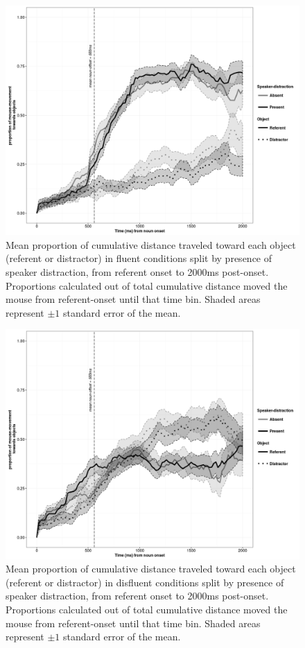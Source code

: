 \documentclass[man]{apa6}
\begin{document}
\begin{figure}
  \centering
	\includegraphics[scale=.5]{mflu.png}
  \caption{Mean proportion of cumulative distance traveled toward each object (referent or distractor) in fluent conditions split by presence of speaker distraction, from referent onset to 2000ms post-onset. Proportions calculated out of total cumulative distance moved the mouse from referent-onset until that time bin. Shaded areas represent $\pm 1$ standard error of the mean.}
  \label{fig:mflu}
\end{figure}





\begin{figure}
  \centering
	\includegraphics[scale=.5]{mdisfl.png}
  \caption{Mean proportion of cumulative distance traveled toward each object (referent or distractor) in disfluent conditions split by presence of speaker distraction, from referent onset to 2000ms post-onset. Proportions calculated out of total cumulative distance moved the mouse from referent-onset until that time bin. Shaded areas represent $\pm 1$ standard error of the mean.}
  \label{fig:mdis}
\end{figure}
\end{document}
